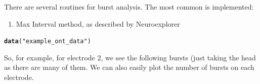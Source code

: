 \documentclass{article}\usepackage[]{graphicx}\usepackage[]{color}
\makeatletter
\newcommand{\hlstr}[1]{\textcolor[rgb]{0.192,0.494,0.8}{#1}}%
\newcommand{\hlstd}[1]{\textcolor[rgb]{0.345,0.345,0.345}{#1}}%
\newcommand{\hlkwd}[1]{\textcolor[rgb]{0.737,0.353,0.396}{\textbf{#1}}}%
\newenvironment{kframe}{%
 \def\at@end@of@kframe{}%
 \ifinner\ifhmode%
  \def\at@end@of@kframe{\end{minipage}}%
  \begin{minipage}{\columnwidth}%
 \fi\fi%
 \def\FrameCommand##1{\hskip\@totalleftmargin \hskip-\fboxsep
 \colorbox{shadecolor}{##1}\hskip-\fboxsep
     \hskip-\linewidth \hskip-\@totalleftmargin \hskip\columnwidth}%
 \MakeFramed {\advance\hsize-\width
   \@totalleftmargin\z@ \linewidth\hsize
   \@setminipage}}%
 {\par\unskip\endMakeFramed%
 \at@end@of@kframe}
\newenvironment{knitrout}{}{} %
\makeatother
\begin{document}
There are several routines for burst analysis. The most common is implemented:

\begin{enumerate}
\item Max Interval method, as described by Neuroexplorer \citep{neuroexplorer}

\end{enumerate}

\begin{knitrout}
\color{fgcolor}\begin{kframe}
\begin{alltt}
\hlkwd{data}\hlstd{(}\hlstr{"example_ont_data"}\hlstd{)}
\end{alltt}
\end{kframe}
\end{knitrout}


So, for example, for electrode 2, we see the following bursts (just
taking the head as there are many of them.  We can also easily plot
the number of bursts on each electrode.
\end{document}
